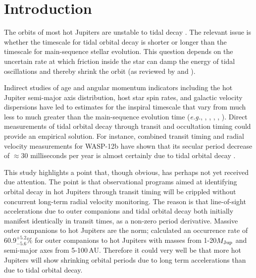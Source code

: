 \documentclass[12pt,twocolumn,tighten]{aastex62}
\begin{document}


\section{Introduction}

The orbits of most hot Jupiters are unstable to tidal decay
\citep{counselman_outcomes_1973,hut_stability_1980,rasio_tidal_1996,levrard_falling_2009,matsumura_tidal_2010}.
The relevant issue is whether the timescale for tidal orbital decay is
shorter or longer than the timescale for main-sequence stellar
evolution.  This question depends on the uncertain rate at which
friction inside the star can damp the energy of tidal oscillations and
thereby shrink the orbit (as reviewed by \citealt{Mazeh2008} and
\citealt{ogilvie_tidal_2014}).

Indirect studies of age and angular momentum indicators including the
hot Jupiter semi-major axis distribution, host star spin rates, and
galactic velocity dispersions have led to estimates for the
inspiral timescale that vary from much less to much greater than
the main-sequence evolution time  ({\it e.g.},
\citealt{jackson_observational_2009}, \citealt{teitler_why_2014},
\citealt{penev_empirical_2018}, \citealt{cameron_hierarchical_2018},
\citealt{hamer_schlaufman_2019}).  Direct
measurements of tidal orbital decay through transit and occultation
timing could provide an empirical solution.  For instance, combined
transit timing and radial velocity measurements for WASP-12b have
shown that its secular period decrease of $\approx$30 milliseconds per
year is almost certainly due to tidal orbital decay
\citep{maciejewski_departure_2016,patra_2017,yee_orbit_2020}.

This study highlights a point that, though obvious, has perhaps not
yet received due attention.  The point is that observational programs
aimed at identifying orbital decay in hot Jupiters through transit
timing will be crippled without concurrent long-term radial velocity
monitoring.  The reason is that line-of-sight accelerations due to
outer companions \citep[{\it e.g.},][]{agol_detecting_2005} and tidal
orbital decay both initially manifest identically in transit times, as
a non-zero period derivative.  Massive outer companions to hot
Jupiters are the norm; \citet{bryan_statistics_2016} calculated an
occurrence rate of $60.9^{+5.2}_{-5.6}\%$ for outer companions to hot
Jupiters with masses from 1-20$M_{\rm Jup}$ and semi-major axes from
5-100$\,$AU.  Therefore it could very well be that more hot Jupiters
will show shrinking orbital periods due to long term accelerations
than due to tidal orbital decay.
\end{document}
